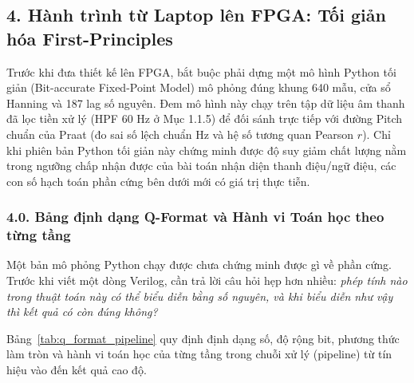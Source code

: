 \documentclass[11pt,a4paper]{article}
\begin{document}
\subsection*{4. Hành trình từ Laptop lên FPGA: Tối giản hóa First-Principles}

\begin{verifygate}
Trước khi đưa thiết kế lên FPGA, bắt buộc phải dựng một mô hình Python tối giản (Bit-accurate Fixed-Point Model) mô phỏng đúng khung 640 mẫu, cửa sổ Hanning và 187 lag số nguyên. Đem mô hình này chạy trên tập dữ liệu âm thanh đã lọc tiền xử lý (HPF 60 Hz ở Mục 1.1.5) để đối sánh trực tiếp với đường Pitch chuẩn của Praat (đo sai số lệch chuẩn Hz và hệ số tương quan Pearson $r$). Chỉ khi phiên bản Python tối giản này chứng minh được độ suy giảm chất lượng nằm trong ngưỡng chấp nhận được của bài toán nhận diện thanh điệu/ngữ điệu, các con số hạch toán phần cứng bên dưới mới có giá trị thực tiễn.
\end{verifygate}

\subsubsection*{4.0. Bảng định dạng Q-Format và Hành vi Toán học theo từng tầng}

Một bản mô phỏng Python chạy được chưa chứng minh được gì về phần cứng. Trước khi viết một dòng Verilog, cần trả lời câu hỏi hẹp hơn nhiều: \emph{phép tính nào trong thuật toán này có thể biểu diễn bằng số nguyên, và khi biểu diễn như vậy thì kết quả có còn đúng không?}

Bảng~\ref{tab:q_format_pipeline} quy định định dạng số, độ rộng bit, phương thức làm tròn và hành vi toán học của từng tầng trong chuỗi xử lý (pipeline) từ tín hiệu vào đến kết quả cao độ.
\end{document}
